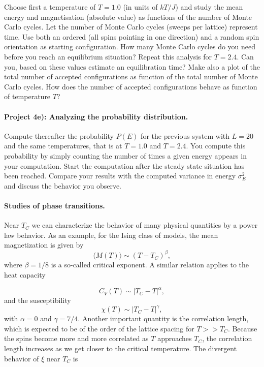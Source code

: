 \documentclass[%
oneside,                 %
final,                   %
10pt]{article}
\begin{document}
Choose first a temperature of $T=1.0$ (in units of $kT/J$) and study the 
mean energy and magnetisation (absolute value) as functions of the number of Monte Carlo cycles. Let the number of Monte Carlo cycles (sweeps per lattice)
represent time.
Use both an ordered (all spins pointing in one direction) and a random
spin orientation as starting configuration. 
How many Monte Carlo cycles do you need before you reach an equilibrium situation?
Repeat this analysis for $T=2.4$. 
Can you, based on these values estimate an equilibration time?
Make also a plot of the total number of accepted configurations 
as function of the total number of Monte Carlo cycles. How does the number of
accepted configurations behave as function of temperature $T$?

\paragraph{Project 4e): Analyzing the probability distribution.}
Compute thereafter the probability
$P(E)$ for the previous system with $L=20$ and the same temperatures, that is at $T=1.0$ and $T=2.4$.
You compute this probability by simply counting the number of times a 
given energy appears in your computation. Start the computation after 
the steady state situation has been reached.
Compare your results with the computed variance in energy 
$\sigma^2_E$ and discuss the behavior you observe. 

\paragraph{Studies of phase transitions.}
Near $T_C$ we can characterize the behavior of many physical quantities
by a power law behavior.
As an example, for the Ising class of models, 
the mean magnetization is given by
\[
  \langle M(T) \rangle \sim \left(T-T_C\right)^{\beta},
\]
where $\beta=1/8$ is a so-called critical exponent. A similar relation
applies to the heat capacity

\[
  C_V(T) \sim \left|T_C-T\right|^{\alpha},
\]
and the susceptibility
\begin{equation}
  \chi(T) \sim \left|T_C-T\right|^{\gamma},
\end{equation}
with $\alpha = 0$ and $\gamma = 7/4$.
Another important quantity is the correlation length, which is expected
to be of the order of the lattice spacing for $T>> T_C$. Because the spins
become more and more correlated as $T$ approaches $T_C$, the correlation
length increases as we get closer to the critical temperature. The divergent
behavior of $\xi$ near $T_C$ 
is
\end{document}
